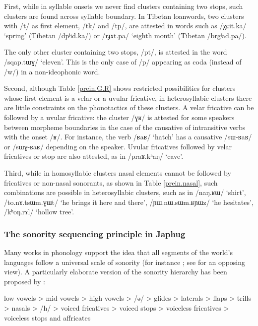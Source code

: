 \documentclass[oneside,a4paper,11pt]{article}
\newcommand{\ipa}[1]{\mbox{\phon/#1/}}
\begin{document}
 First, while in syllable onsets we never find clusters containing two stops, such clusters are found across syllable boundary. In Tibetan loanwords, two clusters with \ipa{t} as first element,  \ipa{tk} and \ipa{tp}, are attested in words such as \ipa{χɕit.ka} `spring' (Tibetan \ipa{dpʲid.ka}) or \ipa{rɟɤt.pa} `eighth month' (Tibetan \ipa{brgʲad.pa}). 
 
 The only  other cluster containing two stops, \ipa{pt}, is attested in the word  \ipa{sqap.tɯɣ} `eleven'. This is the only case of \ipa{p} appearing as coda (instead of \ipa{w}) in a non-ideophonic  word.
 
 Second, although Table \ref{prein.G.R} shows restricted possibilities for clusters whose first element is a velar or a uvular fricative, in heterosyllabic clusters there are little constraints on the phonotactics of these clusters. A velar fricative can be followed by a uvular fricative:  the cluster \ipa{ɣʁ} is attested for some speakers between morpheme boundaries in the case of the causative of intransitive verbs with the onset \ipa{ʁ}. For instance, the verb \ipa{ʁaʁ} `hatch' has a causative \ipa{sɯ-ʁaʁ} or \ipa{sɯɣ-ʁaʁ} depending on the speaker. Uvular fricatives followed by velar fricatives or stop are also attested, as in \ipa{praʁ.kʰaŋ} `cave'.
 
Third, while in homosyllabic clusters nasal elements cannot be followed by fricatives or non-nasal sonorants, as shown in Table \ref{prein.nasal}, such combinations are possible in heterosyllabic clusters, such as in \ipa{naŋ.ʁɯ} `shirt', \ipa{to.nɤ.tsɯm.ɣɯt} `he brings it here and there', \ipa{ɲɯ.nɯ.sɯm.ʁɲɯz} `he hesitates', \ipa{kʰoŋ.rɤl} `hollow tree'.

\subsubsection*{The sonority sequencing principle in Japhug}
Many works in phonology support the idea that all segments of the world's languages follow a universal scale of sonority (for instance \citealt{vennemann88syllable, blevins95syllable, parker02sonority, baroni14invariant}; see \citealt{ohala90sonority} for an opposing view). A particularly elaborate version of the sonority hierarchy has been proposed by \citet[235]{parker02sonority}:
\begin{exe}
\ex 
\glt low vowels > mid vowels > high vowels > \ipa{ə} > glides > laterals > flaps
> trills > nasals > \ipa{h} > voiced fricatives > voiced stops > voiceless
fricatives > voiceless stops and affricates
\end{exe}
\end{document}
